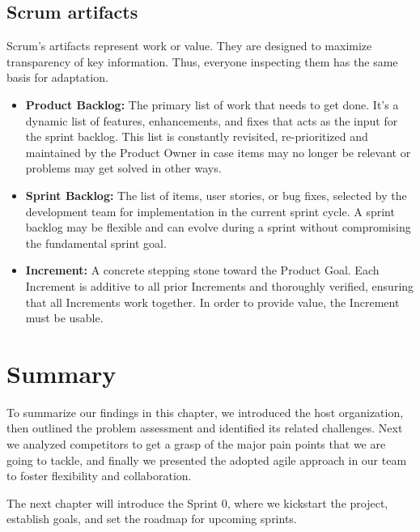\subsection{Scrum artifacts}
Scrum’s artifacts represent work or value. They are designed to maximize transparency of key information.
Thus, everyone inspecting them has the same basis for adaptation.

\begin{itemize}
      \item \textbf{Product Backlog:} The primary list of work that needs to get done. It's a dynamic list
            of features, enhancements, and fixes that acts as the input for the sprint backlog.
            This list is constantly revisited, re-prioritized and maintained by the Product Owner in case items
            may no longer be relevant or problems may get solved in other ways.
      \item \textbf{Sprint Backlog:} The list of items, user stories, or bug fixes, selected by the
            development team for implementation in the current sprint cycle. A sprint backlog may be flexible
            and can evolve during a sprint without compromising the fundamental sprint goal.
      \item \textbf{Increment:} A concrete stepping stone toward the Product Goal.
            Each Increment is additive to all prior Increments and thoroughly verified, ensuring that all
            Increments work together. In order to provide value, the Increment must be usable.
\end{itemize}
\raggedbottom

\section*{Summary}
To summarize our findings in this chapter, we introduced the host organization, then outlined the problem
assessment and identified its related challenges. Next we analyzed competitors to get a grasp of the major
pain points that we are going to tackle, and finally we presented the adopted agile approach in our team
to foster flexibility and collaboration.

The next chapter will introduce the Sprint 0, where we kickstart the project, establish goals, and set
the roadmap for upcoming sprints.



